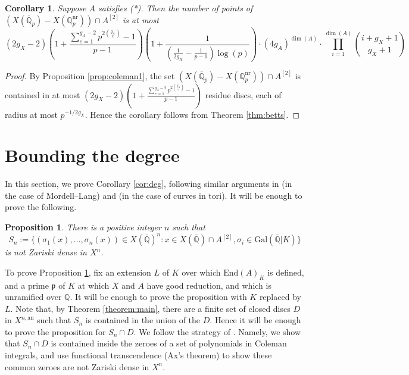 \documentclass[11pt]{amsart}
\def\Q{\mathbb Q}
\newcommand{\an}{\mathrm{an}}
\newcommand{\End}{\mathrm{End}}
\theoremstyle{plain}
\newtheorem{proposition}{Proposition}
\newtheorem{corollary}{Corollary}
\theoremstyle{definition}
\newcommand{\Gal}{\mathrm{Gal}}
\begin{document}
\begin{corollary}\label{cor:ramm}
Suppose $A$ satisfies (*).
Then the number of points of $(X(\overline{\Q }_p )-X(\Q _p ^{\mathrm{nr}}))\cap A^{[2]}$ is at most 
\[
(2g_X -2)(1+\frac{\sum _{e=1}^{g_A-2}p^{2\binom{g_A }{e}}-1}{p-1})
\left( 1+\frac{1}{(\frac{1}{2g_X} -\frac{1}{p-1})\log (p)}\right) \cdot (4g_A )^{\dim (A)}\cdot \prod _{i=1}^{\dim (A)} \binom{i+g_X +1}{g_X +1}
\]
\end{corollary}
\begin{proof}
By Proposition \ref{prop:coleman1}, the set $(X(\overline{\Q }_p )-X(\Q _p ^{\mathrm{nr}}))\cap A^{[2]}$ is contained in at most $(2g_X-2)(1+\frac{\sum _{e=1}^{g_A-2}p^{2\binom{g_A }{e}}-1}{p-1})$ residue discs, each of radius at most $p^{-1/2g_X}$. Hence the corollary follows from Theorem \ref{thm:betts}.
\end{proof}

\section{Bounding the degree}\label{sec:deg}
In this section, we prove Corollary \ref{cor:deg}, following similar arguments in \cite{DP25} (in the case of Mordell--Lang) and \cite{approaches} (in the case of curves in tori). It will be enough to prove the following.

\begin{proposition}\label{prop:gal}
There is a positive integer $n$ such that 
\[
S_n :=\{ (\sigma _1 (x),\ldots ,\sigma _n (x))\in X(\overline{\Q })^n :x\in X(\overline{\Q })\cap A^{[2]}, \sigma _i \in \Gal (\overline{\Q }|K) \}
\]
is not Zariski dense in $X^n$.
\end{proposition}
To prove Proposition \ref{prop:gal}, fix an extension $L$ of $K$ over which $\End (A)_{\overline{K}}$ is defined, and a prime $\mathfrak{p}$ of $K$ at which $X$ and $A$ have good reduction, and which is unramified over $\Q$. It will be enough to prove the proposition with $K$ replaced by $L$. Note that, by Theorem \ref{theorem:main}, there are a finite set of closed discs $D$ in $X^{n,\an }$ such that $S_n$ is contained in the union of the $D$. Hence it will be enough to prove the proposition for $S_n \cap D$. We follow the strategy of \cite{approaches}. Namely, we show that $S_n \cap D$ is contained inside the zeroes of a set of polynomials in Coleman integrals, and use functional transcendence (Ax's theorem) to show these common zeroes are not Zariski dense in $X^n$.
\end{document}
